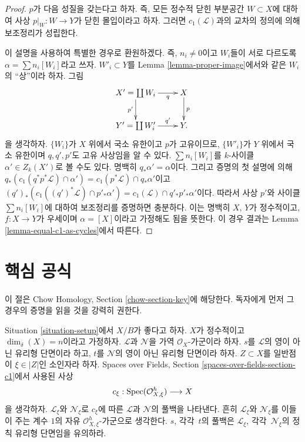 \begin{proof}
$p$가 다음 성질을 갖는다고 하자. 즉, 모든 정수적 닫힌 부분공간
$W \subset X$에 대하여 사상 $p|_W : W \to Y$가 닫힌 몰입이라고 하자.
그러면 $c_1(\mathcal{L})$과의 교차의 정의에 의해 보조정리가 성립한다.

\medskip\noindent
이 설명을 사용하여 특별한 경우로 환원하겠다. 즉,
$n_i \not = 0$이고 $W_i$들이 서로 다르도록
$\alpha = \sum n_i[W_i]$라고 쓰자. $W'_i \subset Y$를 Lemma
\ref{lemma-proper-image}에서와 같은 $W_i$의 ``상''이라 하자. 그림
$$
\xymatrix{
X' = \coprod W_i \ar[r]_-q \ar[d]_{p'} & X \ar[d]^p \\
Y' = \coprod W'_i \ar[r]^-{q'} & Y.
}
$$
을 생각하자. $\{W_i\}$가 $X$ 위에서 국소 유한이고 $p$가 고유이므로,
$\{W'_i\}$가 $Y$ 위에서 국소 유한이며 $q, q', p'$도 고유 사상임을
알 수 있다.
$\sum n_i[W_i]$를 $k$-사이클 $\alpha' \in Z_k(X')$로 볼 수도 있다.
명백히 $q_*\alpha' = \alpha$이다. 그리고 증명의 첫 설명에 의해
$q_*(c_1(q^*p^*\mathcal{L}) \cap \alpha')
= c_1(p^*\mathcal{L}) \cap q_*\alpha'$이고
$(q')_*(c_1((q')^*\mathcal{L}) \cap p'_*\alpha') =
c_1(\mathcal{L}) \cap q'_*p'_*\alpha'$이다. 따라서 사상 $p'$와
사이클 $\sum n_i[W_i]$에 대하여 보조정리를 증명하면 충분하다.
이는 명백히 $X$, $Y$가 정수적이고,
$f : X \to Y$가 우세이며 $\alpha = [X]$이라고 가정해도 됨을 뜻한다.
이 경우 결과는 Lemma \ref{lemma-equal-c1-as-cycles}에서 따른다.
\end{proof}

\section{핵심 공식}
\label{section-key}

\noindent
이 절은 Chow Homology, Section \ref{chow-section-key}에 해당한다.
독자에게 먼저 그 경우의 증명을 읽을 것을 강력히 권한다.

\medskip\noindent
Situation \ref{situation-setup}에서 $X/B$가 좋다고 하자. $X$가
정수적이고 $\dim_\delta(X) = n$이라고 가정하자. $\mathcal{L}$과
$\mathcal{N}$을 가역 $\mathcal{O}_X$-가군이라 하자. $s$를
$\mathcal{L}$의 영이 아닌 유리형 단면이라 하고, $t$를
$\mathcal{N}$의 영이 아닌 유리형 단면이라 하자.
$Z \subset X$를 일반점이 $\xi \in |Z|$인 소인자라 하자.
Spaces over Fields, Section \ref{spaces-over-fields-section-c1}에서
사용된 사상
$$
c_\xi : \mathop{\mathrm{Spec}}(\mathcal{O}_{X, \xi}^h) \longrightarrow X
$$
을 생각하자. $\mathcal{L}_\xi$와 $\mathcal{N}_\xi$로
$c_\xi$에 따른 $\mathcal{L}$과 $\mathcal{N}$의 풀백을 나타낸다.
흔히 $\mathcal{L}_\xi$와 $\mathcal{N}_\xi$를 이들이 주는 계수
$1$의 자유 $\mathcal{O}_{X, \xi}^h$-가군으로 생각한다.
$s$, 각각\ $t$의 풀백은 $\mathcal{L}_\xi$, 각각\ $\mathcal{N}_\xi$의
정칙 유리형 단면임을 유의하라.

